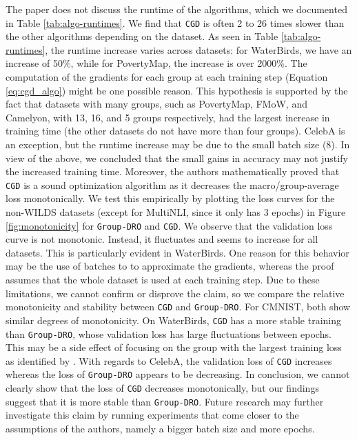 {The paper does not discuss the runtime of the algorithms, which we documented in Table \ref{tab:algo-runtimes}. We find that \texttt{CGD} is often 2 to 26 times slower than the other algorithms depending on the dataset. As seen in Table \ref{tab:algo-runtimes}, the runtime increase varies across datasets: for WaterBirds, we have an increase of 50\%, while for PovertyMap, the increase is over 2000\%. The computation of the gradients for each group at each training step (Equation \ref{eq:cgd_algo}) might be one possible reason. This hypothesis is supported by the fact that datasets with many groups, such as PovertyMap, FMoW, and Camelyon, with 13, 16, and 5 groups respectively, had the largest increase in training time (the other datasets do not have more than four groups). CelebA is an exception, but the runtime increase may be due to the small batch size (8). In view of the above, we concluded that the small gains in accuracy may not justify the increased training time. Moreover, the authors mathematically proved that \texttt{CGD} is a sound optimization algorithm as it decreases the macro/group-average loss monotonically. We test this empirically by plotting the loss curves for the non-WILDS datasets (except for MultiNLI, since it only has 3 epochs) in Figure \ref{fig:monotonicity} for \texttt{Group-DRO} and \texttt{CGD}. We observe that the validation loss curve is not monotonic. Instead, it fluctuates and seems to increase for all datasets. This is particularly evident in WaterBirds. One reason for this behavior may be the use of batches to to approximate the gradients, whereas the proof assumes that the whole dataset is used at each training step. Due to these limitations, we cannot confirm or disprove the claim, so we compare the relative monotonicity and stability between \texttt{CGD} and \texttt{Group-DRO}. For CMNIST, both show similar degrees of monotonicity. On WaterBirds, \texttt{CGD} has a more stable training than \texttt{Group-DRO}, whose validation loss has large fluctuations between epochs. This may be a side effect of focusing on the group with the largest training loss as identified by \cite{piratla2022focus}. With regards to CelebA, the validation loss of \texttt{CGD} increases whereas the loss of \texttt{Group-DRO} appears to be decreasing. In conclusion, we cannot clearly show that the loss of \texttt{CGD} decreases monotonically, but our findings suggest that it is more stable than \texttt{Group-DRO}. Future research may further investigate this claim by running experiments that come closer to the assumptions of the authors, namely a bigger batch size and more epochs.

}
